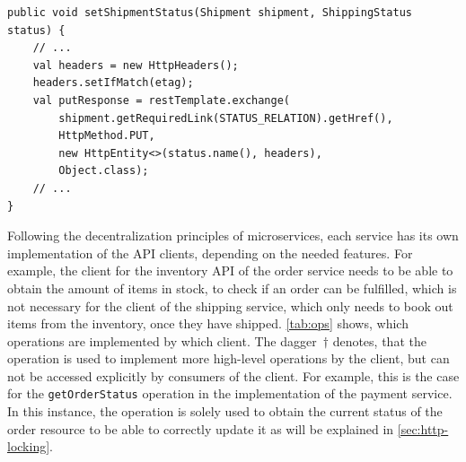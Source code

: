 \begin{lstlisting}[caption={Updating Shipment Statuses is Implemented Using Link Relations}, style=java-ext, label={lst:rest-url-usage}]
public void setShipmentStatus(Shipment shipment, ShippingStatus status) {
    // ...
    val headers = new HttpHeaders();
    headers.setIfMatch(etag);
    val putResponse = restTemplate.exchange(
        shipment.getRequiredLink(STATUS_RELATION).getHref(), 
        HttpMethod.PUT, 
        new HttpEntity<>(status.name(), headers), 
        Object.class);
    // ...
}
\end{lstlisting}

Following the decentralization principles of microservices, each service has its own implementation of the \ac{API} clients, depending on the needed features.
For example, the client for the inventory \ac{API} of the order service needs to be able to obtain the amount of items in stock, to check if an order can be fulfilled, which is not necessary for the client of the shipping service, which only needs to book out items from the inventory, once they have shipped.
\autoref{tab:ops} shows, which operations are implemented by which client.
The dagger~$\dagger$ denotes, that the operation is used to implement more high-level operations by the client, but can not be accessed explicitly by consumers of the client.
For example, this is the case for the \texttt{getOrderStatus} operation in the implementation of the payment service.
In this instance, the operation is solely used to obtain the current status of the order resource to be able to correctly update it as will be explained in \autoref{sec:http-locking}.

